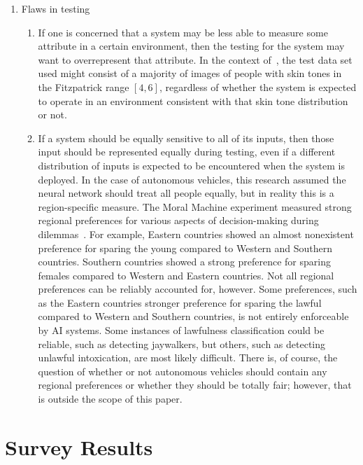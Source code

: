 \documentclass[]{report}
\begin{document}
\begin{enumerate}
    \item Flaws in testing
    \begin{enumerate}
        \item If one is concerned that a system may be less able to measure some attribute in a
        certain environment, then the testing for the system may want to overrepresent that
        attribute. In the context of~\cite{wilson2019predictive}, the test data set used might
        consist of a majority of images of people with skin tones in the Fitzpatrick range $[4, 6]$,
        regardless of whether the system is expected to operate in an environment consistent with
        that skin tone distribution or not.

        \item If a system should be equally sensitive to all of its inputs, then those input should
        be represented equally during testing, even if a different distribution of inputs is
        expected to be encountered when the system is deployed. In the case of autonomous vehicles,
        this research assumed the neural network should treat all people equally, but in reality
        this is a region-specific measure. The Moral Machine experiment measured strong regional
        preferences for various aspects of decision-making during dilemmas~\cite{awad2018moral}. For
        example, Eastern countries showed an almost nonexistent preference for sparing the young
        compared to Western and Southern countries. Southern countries showed a strong preference
        for sparing females compared to Western and Eastern countries. Not all regional preferences
        can be reliably accounted for, however. Some preferences, such as the Eastern countries
        stronger preference for sparing the lawful compared to Western and Southern countries, is
        not entirely enforceable by AI systems. Some instances of lawfulness classification could be
        reliable, such as detecting jaywalkers, but others, such as detecting unlawful intoxication,
        are most likely difficult. There is, of course, the question of whether or not autonomous
        vehicles should contain any regional preferences or whether they should be totally fair;
        however, that is outside the scope of this paper.
    \end{enumerate}
\end{enumerate}
    
\FloatBarrier
\section{Survey Results}
\end{document}
